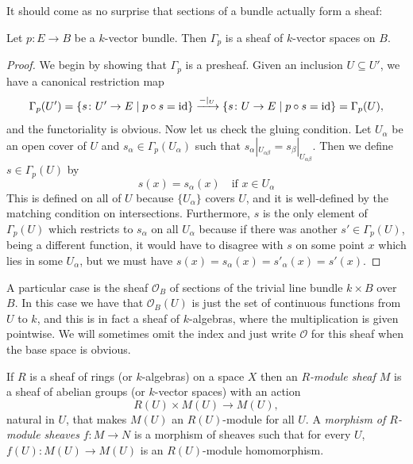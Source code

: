 \documentclass[a4paper,openany]{scrbook}
\begin{document}
It should come as no surprise that sections of a bundle actually form a sheaf:

\begin{prop}
Let $p\colon E \to B$ be a $k$-vector bundle. Then $\Gamma_p$ is a sheaf of $k$-vector spaces on $B$.
\end{prop}
\begin{proof}
We begin by showing that $\Gamma_p$ is a presheaf. Given an inclusion $U \subseteq U'$, we have a canonical restriction map
\[
\Gamma_p(U') = \{s \colon U' \to E \mid p \circ s = \operatorname{id}\} \xrightarrow{-|_U} \{s \colon U \to E \mid p \circ s = \operatorname{id}\} = \Gamma_p(U),
\]
and the functoriality is obvious. Now let us check the gluing condition. Let $U_\alpha$ be an open cover of $U$ and $s_\alpha \in \Gamma_p(U_\alpha)$ such that $s_\alpha|_{U_{\alpha\beta}} = s_\beta|_{U_{\alpha\beta}}$. Then we define $s \in \Gamma_p(U)$ by
\[
s(x) = s_\alpha(x) \quad \text{if } x \in U_\alpha
\]
This is defined on all of $U$ because $\{U_\alpha\}$ covers $U$, and it is well-defined by the matching condition on intersections. Furthermore, $s$ is the only element of $\Gamma_p(U)$ which restricts to $s_\alpha$ on all $U_\alpha$ because if there was another $s' \in \Gamma_p(U)$, being a different function, it would have to disagree with $s$ on some point $x$ which lies in some $U_\alpha$, but we must have $s(x) = s_\alpha(x) = s'_\alpha(x) = s'(x)$.
\end{proof}

\begin{example}
A particular case is the sheaf $\mathcal O_B$ of sections of the trivial line bundle $k \times B$ over $B$. In this case we have that $\mathcal O_B(U)$ is just the set of continuous functions from $U$ to $k$, and this is in fact a sheaf of $k$-algebras, where the multiplication is given pointwise. We will sometimes omit the index and just write $\mathcal O$ for this sheaf when the base space is obvious.
\end{example}

If $R$ is a sheaf of rings (or $k$-algebras) on a space $X$ then an \emph{$R$-module sheaf $M$} is a sheaf of abelian groups (or $k$-vector spaces) with an action
\[
R(U) \times M(U) \to M(U),
\]
natural in $U$, that makes $M(U)$ an $R(U)$-module for all $U$. A \emph{morphism of $R$-module sheaves} $f\colon M \to N$ is a morphism of sheaves such that for every $U$, $f(U)\colon M(U) \to M(U)$ is an $R(U)$-module homomorphism.
\end{document}
